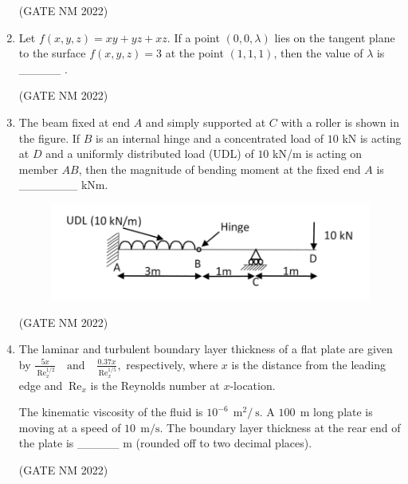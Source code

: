 \documentclass[journal,12pt,onecolumn]{IEEEtran}
\theoremstyle{remark}
\begin{document}
\begin{enumerate}
\begin{multicols}{2}
	\end{multicols}

\hfill(GATE NM 2022)







\item  Let $ f(x, y, z) = xy + yz + xz . $ If a point $ (0, 0, \lambda) $ lies on the tangent plane to the surface  
$
f(x, y, z) = 3
$
at the point $ (1, 1, 1) $, then the value of $ \lambda $ is \_\_\_\_\_ .

\hfill(GATE NM 2022)







\item  The beam fixed at end $A$ and simply supported at $C$ with a roller is shown in the figure.  
If $B$  is an internal hinge and a concentrated load of $10$ kN is acting at $D$ and a uniformly distributed load (UDL) of $10$ kN/m  is acting on member $AB$, then the magnitude of bending moment at the fixed end $A$ is \_\_\_\_\_\_\_ kNm.

\begin{figure}[h]
	\centering
    \includegraphics[width=0.3\columnwidth]{fig4}
	\caption{}
	\label{fig:placeholder}
\end{figure}

\hfill(GATE NM 2022)







\item  The laminar and turbulent boundary layer thickness of a flat plate are given by  
$
\frac{5x}{\ \text{Re}_x^{1/2}}
\quad \text{and} \quad
\frac{0.37x}{\ \text{Re}_x^{1/5}},
$
respectively, where $x$ is the distance from the leading edge and $\ \text{Re}_x$ is the Reynolds number at $x$-location.  

The kinematic viscosity of the fluid is $10^{-6}~\ \text{m}^2/\ \text{s}$.  
A $100~\ \text{m}$  long plate is moving at a speed of $10~\ \text{m/s}$.  
The boundary layer thickness at the rear end of the plate is \_\_\_\_\_ m (rounded off to two decimal places).

\hfill(GATE NM 2022)







\end{enumerate}
\end{document}
